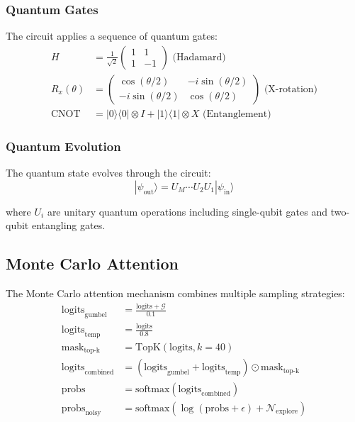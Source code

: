 \documentclass{article}
\begin{document}
\subsubsection{Quantum Gates}
The circuit applies a sequence of quantum gates:
\begin{align*}
H &= \frac{1}{\sqrt{2}}\begin{pmatrix} 1 & 1 \\ 1 & -1 \end{pmatrix} \text{ (Hadamard)} \\
R_x(\theta) &= \begin{pmatrix} \cos(\theta/2) & -i\sin(\theta/2) \\ -i\sin(\theta/2) & \cos(\theta/2) \end{pmatrix} \text{ (X-rotation)} \\
\text{CNOT} &= |0\rangle\langle0| \otimes I + |1\rangle\langle1| \otimes X \text{ (Entanglement)}
\end{align*}

\subsubsection{Quantum Evolution}
The quantum state evolves through the circuit:
\begin{equation}
|\psi_{\text{out}}\rangle = U_M\cdots U_2U_1|\psi_{\text{in}}\rangle
\end{equation}

where $U_i$ are unitary quantum operations including single-qubit gates and two-qubit entangling gates.

\subsection{Monte Carlo Attention}
The Monte Carlo attention mechanism combines multiple sampling strategies:
\begin{align*}
\text{logits}_{\text{gumbel}} &= \frac{\text{logits} + \mathcal{G}}{0.1} \\
\text{logits}_{\text{temp}} &= \frac{\text{logits}}{0.8} \\
\text{mask}_{\text{top-k}} &= \text{TopK}(\text{logits}, k=40) \\
\text{logits}_{\text{combined}} &= (\text{logits}_{\text{gumbel}} + \text{logits}_{\text{temp}}) \odot \text{mask}_{\text{top-k}} \\
\text{probs} &= \text{softmax}(\text{logits}_{\text{combined}}) \\
\text{probs}_{\text{noisy}} &= \text{softmax}(\log(\text{probs} + \epsilon) + \mathcal{N}_{\text{explore}})
\end{align*}
\end{document}
